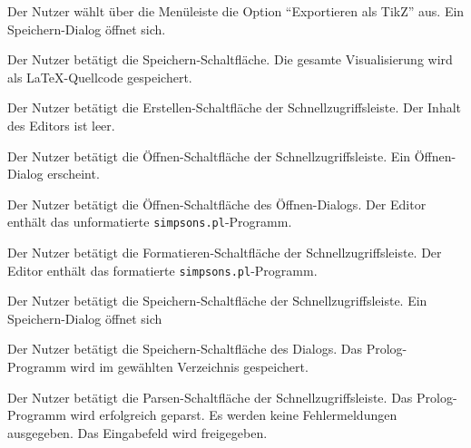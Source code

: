 \documentclass[parskip=full,11pt,twoside]{scrartcl}
\begin{document}
{Der Nutzer wählt über die Menüleiste die Option \enquote{Exportieren als TikZ} aus.}
{Ein Speichern-Dialog öffnet sich.}

{Der Nutzer betätigt die Speichern-Schaltfläche.}
{Die gesamte Visualisierung wird als LaTeX-Quellcode gespeichert.}


{Der Nutzer betätigt die Erstellen-Schaltfläche der Schnellzugriffsleiste.}
{Der Inhalt des Editors ist leer.}

{Der Nutzer betätigt die Öffnen-Schaltfläche der Schnellzugriffsleiste.}
{Ein Öffnen-Dialog erscheint.}

{Der Nutzer betätigt die Öffnen-Schaltfläche des Öffnen-Dialogs.}
{Der Editor enthält das unformatierte \texttt{simpsons.pl}-Programm.}

{Der Nutzer betätigt die Formatieren-Schaltfläche der Schnellzugriffsleiste.}
{Der Editor enthält das formatierte \texttt{simpsons.pl}-Programm.}

{Der Nutzer betätigt die Speichern-Schaltfläche der Schnellzugriffsleiste.}
{Ein Speichern-Dialog öffnet sich}

{Der Nutzer betätigt die Speichern-Schaltfläche des Dialogs.}
{Das Prolog-Programm wird im gewählten Verzeichnis gespeichert.}

{Der Nutzer betätigt die Parsen-Schaltfläche der Schnellzugriffsleiste.}
{Das Prolog-Programm wird erfolgreich geparst. Es werden keine Fehlermeldungen ausgegeben. Das Eingabefeld wird freigegeben.}
\end{document}
